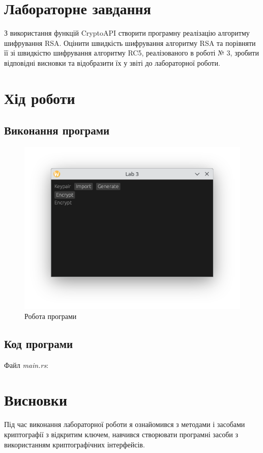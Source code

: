 \documentclass[oneside,14pt]{extarticle}
\begin{document}
\begin{normalsize}
    \section*{Лабораторне завдання}
З використання функцій CryptoAPI створити програмну реалізацію
алгоритму шифрування RSA. Оцінити швидкість шифрування алгоритму RSA
та порівняти її зі швидкістю шифрування алгоритму RC5, реалізованого в
роботі № 3, зробити відповідні висновки та відобразити їх у звіті до
лабораторної роботи.
    
	\section*{Хід роботи}
	
	\subsection*{Виконання програми}
	\begin{figure}[H]
		\centering
		\includegraphics[width=\columnwidth]{1}
		\caption{Робота програми}
	\end{figure}
	
	\subsection*{Код програми}
	Файл \textit{main.rs}:
	{\small	}
	
	\section*{Висновки}
	Під час виконання лабораторної роботи я ознайомився з методами і засобами криптографії з
	відкритим ключем, навчився створювати програмні засоби з використанням
	криптографічних інтерфейсів.
	    
\end{normalsize}
\end{document}
